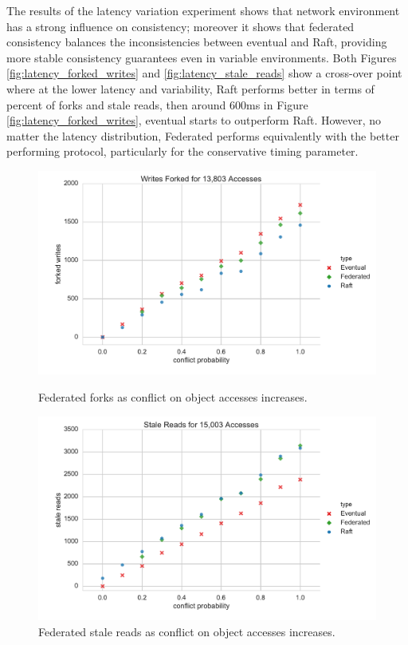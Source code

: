 \documentclass{article}
\begin{document}
The results of the latency variation experiment shows that network environment has a strong influence on consistency; moreover it shows that federated consistency balances the inconsistencies between eventual and Raft, providing more stable consistency guarantees even in variable environments. Both Figures \ref{fig:latency_forked_writes} and \ref{fig:latency_stale_reads} show a cross-over point where at the lower latency and variability, Raft performs better in terms of percent of forks and stale reads, then around 600ms in Figure \ref{fig:latency_forked_writes}, eventual starts to outperform Raft. However, no matter the latency distribution, Federated performs equivalently with the better performing protocol, particularly for the conservative timing parameter.

\begin{figure}
    \centering
      \includegraphics[width=\linewidth]{figures/federated/forked_writes_conflict}
      \caption{Federated forks as conflict on object accesses increases.}
      \label{fig:conflict_forked_writes}
    \endminipage\hfill
      \includegraphics[width=\linewidth]{figures/federated/stale_reads_conflict}
      \caption{Federated stale reads as conflict on object accesses increases.}
      \label{fig:conflict_stale_reads}
    \endminipage
\end{figure}
\end{document}
